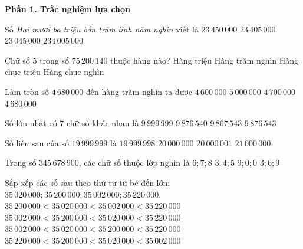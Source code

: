\textbf{Phần 1. Trắc nghiệm lựa chọn}

\begin{ex} %
Số \textit{Hai mươi ba triệu bốn trăm linh năm nghìn} viết là
\choice
{$23\,450\,000$}
{\True $23\,405\,000$}
{$23\,045\,000$}
{$234\,005\,000$}
\end{ex}

\begin{ex} %
Chữ số 5 trong số $75\,200\,140$ thuộc hàng nào?
\choice
{\True Hàng triệu}
{Hàng trăm nghìn}
{Hàng chục triệu}
{Hàng chục nghìn}
\end{ex}

\begin{ex} %
Làm tròn số $4\,680\,000$ đến hàng trăm nghìn ta được
\choice
{$4\,600\,000$}
{$5\,000\,000$}
{\True $4\,700\,000$}
{$4\,680\,000$}
\end{ex}

\begin{ex} %
Số lớn nhất có 7 chữ số khác nhau là
\choice
{$9\,999\,999$}
{$9\,876\,540$}
{$9\,867\,543$}
{\True $9\,876\,543$}
\end{ex}

\begin{ex} %
Số liền sau của số $19\,999\,999$ là
\choice
{$19\,999\,998$}
{\True $20\,000\,000$}
{$20\,000\,001$}
{$21\,000\,000$}
\end{ex}

\begin{ex} %
Trong số $345\,678\,900$, các chữ số thuộc lớp nghìn là
\choice
{\True $6; 7; 8$}
{$3; 4; 5$}
{$9; 0; 0$}
{$3; 6; 9$}
\end{ex}

\begin{ex} %
Sắp xếp các số sau theo thứ tự từ bé đến lớn: $35\,020\,000; 35\,200\,000; 35\,002\,000; 35\,220\,000$.
\choice
{$35\,200\,000 < 35\,020\,000 < 35\,002\,000 < 35\,220\,000$}
{$35\,002\,000 < 35\,200\,000 < 35\,020\,000 < 35\,220\,000$}
{\True $35\,002\,000 < 35\,020\,000 < 35\,200\,000 < 35\,220\,000$}
{$35\,220\,000 < 35\,200\,000 < 35\,020\,000 < 35\,002\,000$}
\end{ex}


